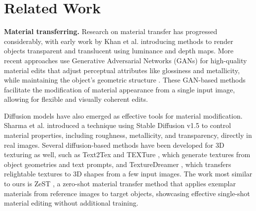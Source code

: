 \section{Related Work}

\textbf{Material transferring.}
Research on material transfer has progressed considerably, with early work by Khan et al. \cite{khan2006image} introducing methods to render objects transparent and translucent using luminance and depth maps. More recent approaches use Generative Adversarial Networks (GANs) \cite{goodfellow2020generative} for high-quality material edits that adjust perceptual attributes like glossiness and metallicity, while maintaining the object’s geometric structure \cite{delanoy2022generative, subias2023wild}. These GAN-based methods facilitate the modification of material appearance from a single input image, allowing for flexible and visually coherent edits.

Diffusion models have also emerged as effective tools for material modification. Sharma et al. \cite{sharma2024alchemist} introduced a technique using Stable Diffusion v1.5 to control material properties, including roughness, metallicity, and transparency, directly in real images. Several diffusion-based methods have been developed for 3D texturing as well, such as Text2Tex \cite{chen2023text2tex} and TEXTure \cite{richardson2023texture}, which generate textures from object geometries and text prompts, and TextureDreamer \cite{yeh2024texturedreamer}, which transfers relightable textures to 3D shapes from a few input images. The work most similar to ours is ZeST \cite{cheng2024zestzeroshotmaterialtransfer}, a zero-shot material transfer method that applies exemplar materials from reference images to target objects, showcasing effective single-shot material editing without additional training.


